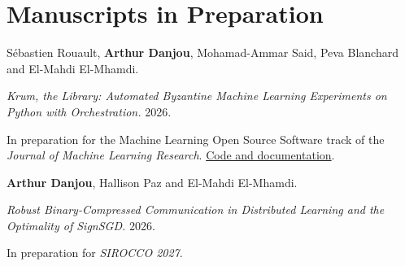 \section{Manuscripts in Preparation}
S\'ebastien Rouault, \textbf{Arthur Danjou}, Mohamad-Ammar Said,
Peva Blanchard and El-Mahdi El-Mhamdi.\par
\emph{Krum, the Library: Automated Byzantine Machine Learning Experiments
on Python with Orchestration.} 2026.\par
In preparation for the Machine Learning Open Source Software track of the
\emph{Journal of Machine Learning Research}.
\href{https://links.arthurdanjou.fr/krum}{Code and documentation}.

\vspace{5pt}
\textbf{Arthur Danjou}, Hallison Paz and El-Mahdi El-Mhamdi.\par
\emph{Robust Binary-Compressed Communication in Distributed Learning and the
Optimality of SignSGD.} 2026.\par
In preparation for \emph{SIROCCO 2027}.
